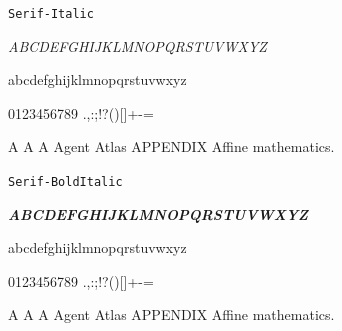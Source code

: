 \documentclass[12pt]{article}
\begin{document}
\texttt{Serif-Italic}\par
{\rmfamily\itshape\fontsize{13}{17}\selectfont ABCDEFGHIJKLMNOPQRSTUVWXYZ\par abcdefghijklmnopqrstuvwxyz\par 0123456789 .,:;!?()[]+-=\par A A A Agent Atlas APPENDIX Affine mathematics.\par}
\texttt{Serif-BoldItalic}\par
{\rmfamily\bfseries\itshape\fontsize{13}{17}\selectfont ABCDEFGHIJKLMNOPQRSTUVWXYZ\par abcdefghijklmnopqrstuvwxyz\par 0123456789 .,:;!?()[]+-=\par A A A Agent Atlas APPENDIX Affine mathematics.\par}
\end{document}
